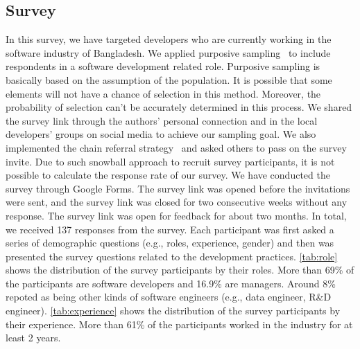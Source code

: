 \subsection{Survey}
\label{survey_participants}
In this survey, we have targeted developers who are currently working in the
software industry of Bangladesh. We applied purposive sampling~\cite{Vogt2005} to
include respondents in a software development related role. Purposive sampling
is basically based on the assumption of the population. It is possible that some
elements will not have a chance of selection in this method. Moreover, the
probability of selection can't be accurately determined in this process. We
shared the survey link through the authors' personal connection and in the local
developers' groups on social media to achieve our sampling goal. We also
implemented the chain referral strategy~\cite{creswell2013} and asked others to
pass on the survey invite. Due to such snowball approach to recruit survey participants, it is not possible to calculate the
response rate of our survey. We have conducted the survey through Google Forms. The survey link was opened
before the invitations were sent, and the survey link was closed for two
consecutive weeks without any response. The survey link was open for feedback
for about two months. In total, we
received 137 responses from the survey. Each participant was first asked a series of demographic questions (e.g., roles, experience, gender) and 
then was presented the survey questions related to the development practices. \tbl\ref{tab:role} shows the distribution of the survey participants by their roles. More than 69\% of the participants 
are software developers and 16.9\% are managers. Around 8\% repoted as being other kinds of software engineers (e.g., data engineer, R\&D engineer). 
\tbl\ref{tab:experience} shows the distribution of the survey participants by their experience. More than 61\% of the participants worked in the
industry for at least 2 years.
 



% 

